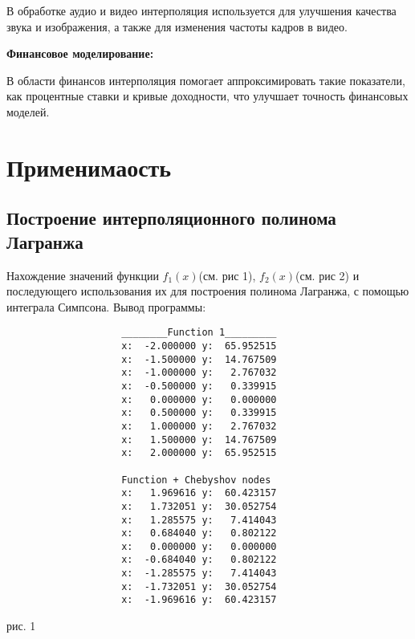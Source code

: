 \documentclass[13pt, a4paper, twoside]{article}
\begin{document}
В обработке аудио и видео интерполяция используется для улучшения качества звука и изображения, а также для изменения частоты кадров в видео.

   
\textbf{Финансовое моделирование:}

В области финансов интерполяция помогает аппроксимировать такие показатели, как процентные ставки и кривые доходности, что улучшает точность финансовых моделей.
\section{Применимаость}
\subsection{Построение интерполяционного полинома Лагранжа}
\tub Нахождение значений функции $f_1(x)$(см. рис 1), $f_2(x)$(см. рис 2) и последующего использования их для построения полинома Лагранжа, с помощью интеграла Симпсона. Вывод программы:
\begin{verbatim}
                    ________Function 1_________
                    x:  -2.000000 y:  65.952515
                    x:  -1.500000 y:  14.767509
                    x:  -1.000000 y:   2.767032
                    x:  -0.500000 y:   0.339915
                    x:   0.000000 y:   0.000000
                    x:   0.500000 y:   0.339915
                    x:   1.000000 y:   2.767032
                    x:   1.500000 y:  14.767509
                    x:   2.000000 y:  65.952515
                    
                    Function + Chebyshov nodes
                    x:   1.969616 y:  60.423157
                    x:   1.732051 y:  30.052754
                    x:   1.285575 y:   7.414043
                    x:   0.684040 y:   0.802122
                    x:   0.000000 y:   0.000000
                    x:  -0.684040 y:   0.802122
                    x:  -1.285575 y:   7.414043
                    x:  -1.732051 y:  30.052754
                    x:  -1.969616 y:  60.423157
\end{verbatim}
\begin{center}
  рис. 1
\end{center}
\end{document}
